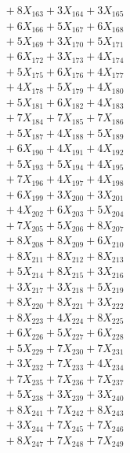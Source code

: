 \documentclass[a4paper,10pt]{article}
\begin{document}
{\begin{align}
&\;  + 8 X_{163} + 3 X_{164} + 3 X_{165} \\[0.3ex]
&\;  + 6 X_{166} + 5 X_{167} + 6 X_{168} \\[0.3ex]
&\;  + 5 X_{169} + 3 X_{170} + 5 X_{171} \\[0.3ex]
&\;  + 6 X_{172} + 3 X_{173} + 4 X_{174} \\[0.3ex]
&\;  + 5 X_{175} + 6 X_{176} + 4 X_{177} \\[0.3ex]
&\;  + 4 X_{178} + 5 X_{179} + 4 X_{180} \\[0.3ex]
&\;  + 5 X_{181} + 6 X_{182} + 4 X_{183} \\[0.3ex]
&\;  + 7 X_{184} + 7 X_{185} + 7 X_{186} \\[0.3ex]
&\;  + 5 X_{187} + 4 X_{188} + 5 X_{189} \\[0.5ex]\allowbreak
&\;  + 6 X_{190} + 4 X_{191} + 4 X_{192} \\[0.3ex]
&\;  + 5 X_{193} + 5 X_{194} + 4 X_{195} \\[0.3ex]
&\;  + 7 X_{196} + 4 X_{197} + 4 X_{198} \\[0.3ex]
&\;  + 6 X_{199} + 3 X_{200} + 3 X_{201} \\[0.3ex]
&\;  + 4 X_{202} + 6 X_{203} + 5 X_{204} \\[0.3ex]
&\;  + 7 X_{205} + 5 X_{206} + 8 X_{207} \\[0.3ex]
&\;  + 8 X_{208} + 8 X_{209} + 6 X_{210} \\[0.3ex]
&\;  + 8 X_{211} + 8 X_{212} + 8 X_{213} \\[0.3ex]
&\;  + 5 X_{214} + 8 X_{215} + 3 X_{216} \\[0.3ex]
&\;  + 3 X_{217} + 3 X_{218} + 5 X_{219} \\[0.5ex]\allowbreak
&\;  + 8 X_{220} + 8 X_{221} + 3 X_{222} \\[0.3ex]
&\;  + 8 X_{223} + 4 X_{224} + 8 X_{225} \\[0.3ex]
&\;  + 6 X_{226} + 5 X_{227} + 6 X_{228} \\[0.3ex]
&\;  + 5 X_{229} + 7 X_{230} + 7 X_{231} \\[0.3ex]
&\;  + 3 X_{232} + 7 X_{233} + 4 X_{234} \\[0.3ex]
&\;  + 7 X_{235} + 7 X_{236} + 7 X_{237} \\[0.3ex]
&\;  + 5 X_{238} + 3 X_{239} + 3 X_{240} \\[0.3ex]
&\;  + 8 X_{241} + 7 X_{242} + 8 X_{243} \\[0.3ex]
&\;  + 3 X_{244} + 7 X_{245} + 7 X_{246} \\[0.3ex]
&\;  + 8 X_{247} + 7 X_{248} + 7 X_{249} \\[0.5ex]\allowbreak

\end{align}}
\end{document}
